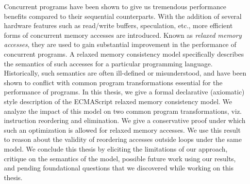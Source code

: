 Concurrent programs have been shown to give us tremendous performance benefits compared to their sequential counterparts.
With the addition of several hardware features such as read/write buffers, speculation, etc., more efficient forms of concurrent memory accesses are introduced.
Known as \textit{relaxed memory accesses}, they are used to gain substantial improvement in the performance of concurrent programs. 
A relaxed memory consistency model specifically describes the semantics of such accesses for a particular programming language. 
Historically, such semantics are often ill-defined or misunderstood, and have been shown to conflict with common program transformations essential for the performance of programs. 
In this thesis, we give a formal declarative (axiomatic) style description of the ECMAScript relaxed memory consistency model. 
We analyze the impact of this model on two common program transformations, viz. instruction reordering and elimination. 
We give a conservative proof under which such an optimization is allowed for relaxed memory accesses. 
We use this result to reason about the validity of reordering accesses outside loops under the same model. 
We conclude this thesis by eliciting the limitations of our approach, critique on the semantics of the model, possible future work using our results, and pending foundational questions that we discovered while working on this thesis.